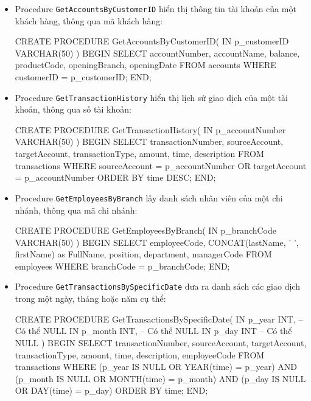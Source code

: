 
\begin{itemize}

    \item Procedure \texttt{GetAccountsByCustomerID} hiển thị thông tin tài khoản của một khách hàng, thông qua mã khách hàng:
    \begin{MySQLCode}
    CREATE PROCEDURE GetAccountsByCustomerID(
        IN p_customerID VARCHAR(50)
    )
    BEGIN
        SELECT accountNumber, accountName, balance, productCode, openingBranch, openingDate
        FROM accounts
        WHERE customerID = p_customerID;
    END;
    \end{MySQLCode}

    \item Procedure \texttt{GetTransactionHistory} hiển thị lịch sử giao dịch của một tài khoản, thông qua số tài khoản:
    \begin{MySQLCode}
    CREATE PROCEDURE GetTransactionHistory(
        IN p_accountNumber VARCHAR(50)
    )
    BEGIN
        SELECT transactionNumber, sourceAccount, targetAccount, transactionType, amount, time, description
        FROM transactions
        WHERE sourceAccount = p_accountNumber OR targetAccount = p_accountNumber
        ORDER BY time DESC;
    END;
    \end{MySQLCode}

    \item Procedure \texttt{GetEmployeesByBranch} lấy danh sách nhân viên của một chi nhánh, thông qua mã chi nhánh:
    \begin{MySQLCode}
    CREATE PROCEDURE GetEmployeesByBranch(
        IN p_branchCode VARCHAR(50)
    )
    BEGIN
        SELECT employeeCode, CONCAT(lastName, ' ', firstName) as FullName, position, department, managerCode
        FROM employees
        WHERE branchCode = p_branchCode;
    END;
    \end{MySQLCode}

    \item Procedure \texttt{GetTransactionsBySpecificDate} đưa ra danh sách các giao dịch trong một ngày, tháng hoặc năm cụ thể:
    \begin{MySQLCode}
    CREATE PROCEDURE GetTransactionsBySpecificDate(
        IN p_year INT,      -- Có thể NULL
        IN p_month INT,     -- Có thể NULL
        IN p_day INT        -- Có thể NULL
    )
    BEGIN
        SELECT transactionNumber, sourceAccount, targetAccount, transactionType, amount, time, description, employeeCode
        FROM transactions
        WHERE
            (p_year IS NULL OR YEAR(time) = p_year) AND
            (p_month IS NULL OR MONTH(time) = p_month) AND
            (p_day IS NULL OR DAY(time) = p_day)
        ORDER BY time;
    END;
    \end{MySQLCode}


\end{itemize}
